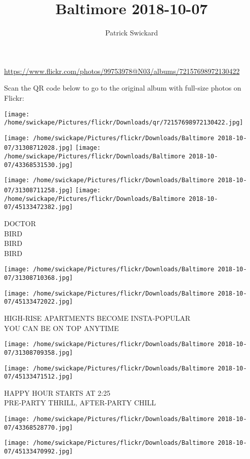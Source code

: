 \documentclass[10pt,letterpaper]{article}
\title{Baltimore 2018-10-07}
\author{Patrick Swickard}
\date{}
\begin{document}
\maketitle

\url{https://www.flickr.com/photos/99753978@N03/albums/72157698972130422}

Scan the QR code below to go to the original album with full-size photos on Flickr:

\texttt{[image: /home/swickape/Pictures/flickr/Downloads/qr/72157698972130422.jpg]}
\pagebreak

\texttt{[image: /home/swickape/Pictures/flickr/Downloads/Baltimore 2018-10-07/31308712028.jpg]}
\texttt{[image: /home/swickape/Pictures/flickr/Downloads/Baltimore 2018-10-07/43368531530.jpg]}

\texttt{[image: /home/swickape/Pictures/flickr/Downloads/Baltimore 2018-10-07/31308711258.jpg]}
\texttt{[image: /home/swickape/Pictures/flickr/Downloads/Baltimore 2018-10-07/45133472382.jpg]}

DOCTOR\\
BIRD\\
BIRD\\
BIRD
\pagebreak

\texttt{[image: /home/swickape/Pictures/flickr/Downloads/Baltimore 2018-10-07/31308710368.jpg]}

\vspace{0.25in}
\texttt{[image: /home/swickape/Pictures/flickr/Downloads/Baltimore 2018-10-07/45133472022.jpg]}

HIGH{-}RISE APARTMENTS BECOME INSTA{-}POPULAR\\
YOU CAN BE ON TOP ANYTIME
\pagebreak

\texttt{[image: /home/swickape/Pictures/flickr/Downloads/Baltimore 2018-10-07/31308709358.jpg]}

\vspace{0.25in}
\texttt{[image: /home/swickape/Pictures/flickr/Downloads/Baltimore 2018-10-07/45133471512.jpg]}

HAPPY HOUR STARTS AT 2:25\\
PRE{-}PARTY THRILL, AFTER{-}PARTY CHILL
\pagebreak

\texttt{[image: /home/swickape/Pictures/flickr/Downloads/Baltimore 2018-10-07/43368528770.jpg]}

\vspace{0.25in}
\texttt{[image: /home/swickape/Pictures/flickr/Downloads/Baltimore 2018-10-07/45133470992.jpg]}
\end{document}
